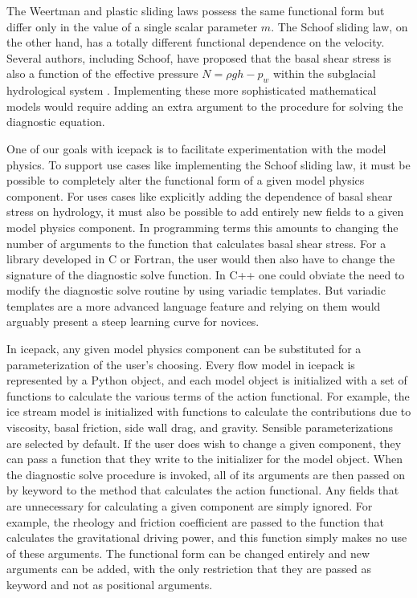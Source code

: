 \documentclass{article}
\theoremstyle{definition}
\theoremstyle{plain}
\begin{document}
The Weertman and plastic sliding laws possess the same functional form but differ only in the value of a single scalar parameter $m$.
The Schoof sliding law, on the other hand, has a totally different functional dependence on the velocity.
Several authors, including Schoof, have proposed that the basal shear stress is also a function of the effective pressure $N = \rho gh - p_w$ within the subglacial hydrological system \citep{budd1979empirical, schoof2005effect}.
Implementing these more sophisticated mathematical models would require adding an extra argument to the procedure for solving the diagnostic equation.

One of our goals with icepack is to facilitate experimentation with the model physics.
To support use cases like implementing the Schoof sliding law, it must be possible to completely alter the functional form of a given model physics component.
For uses cases like explicitly adding the dependence of basal shear stress on hydrology, it must also be possible to add entirely new fields to a given model physics component.
In programming terms this amounts to changing the number of arguments to the function that calculates basal shear stress.
For a library developed in C or Fortran, the user would then also have to change the signature of the diagnostic solve function.
In C++ one could obviate the need to modify the diagnostic solve routine by using variadic templates.
But variadic templates are a more advanced language feature and relying on them would arguably present a steep learning curve for novices.

In icepack, any given model physics component can be substituted for a parameterization of the user's choosing.
Every flow model in icepack is represented by a Python object, and each model object is initialized with a set of functions to calculate the various terms of the action functional.
For example, the ice stream model is initialized with functions to calculate the contributions due to viscosity, basal friction, side wall drag, and gravity.
Sensible parameterizations are selected by default.
If the user does wish to change a given component, they can pass a function that they write to the initializer for the model object.
When the diagnostic solve procedure is invoked, all of its arguments are then passed on by keyword to the method that calculates the action functional.
Any fields that are unnecessary for calculating a given component are simply ignored.
For example, the rheology and friction coefficient are passed to the function that calculates the gravitational driving power, and this function simply makes no use of these arguments.
The functional form can be changed entirely and new arguments can be added, with the only restriction that they are passed as keyword and not as positional arguments.
\end{document}
